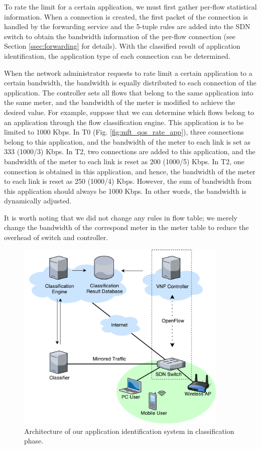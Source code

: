 To rate the limit for a certain application, we must first gather per-flow statistical information. When a connection is created, the first packet of the connection is handled by the forwarding service and the 5-tuple rules are added into the SDN switch to obtain the bandwidth information of the per-flow connection (see Section \ref{ssec:forwarding} for details). With the classified result of application identification, the application type of each connection can be determined.

When the network administrator requests to rate limit a certain application to a certain bandwidth, the bandwidth is equally distributed to each connection of the application. The controller sets all flows that belong to the same application into the same meter, and the bandwidth of the meter is modified to achieve the desired value. For example, suppose that we can determine which flows belong to an application through the flow classification engine. This application is to be limited to 1000 Kbps. In T0 (Fig. \ref{fig:mft_qos_rate_app}), three connections belong to this application, and the bandwidth of the meter to each link is set as 333 (1000/3) Kbps. In T2, two connections are added to this application, and the bandwidth of the meter to each link is reset as 200 (1000/5) Kbps. In T2, one connection is obtained in this application, and hence, the bandwidth of the meter to each link is reset as 250 (1000/4) Kbps. However, the sum of bandwidth from this application should always be 1000 Kbps. In other words, the bandwidth is dynamically adjusted.

It is worth noting that we did not change any rules in flow table; we merely change the bandwidth of the correspond meter in the meter table to reduce the overhead of switch and controller.

\begin{figure}[!t]
\centering
\includegraphics[width=0.9\textwidth]{./fig/classification_classifying}
\caption{Architecture of our application identification system in classification phase.}
\label{fig:class_classifying}
\end{figure}

